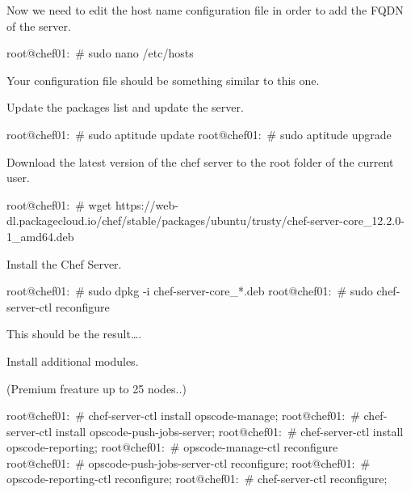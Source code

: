 Now we need to edit the host name configuration file in order to add the FQDN of the server.
\begin{codelisting}
\label{code:}
\codecaption{}
\begin{code}
root@chef01:~# sudo nano /etc/hosts
\end{code}
\end{codelisting}

Your configuration file should be something similar to this one.


Update the packages list and update the server.

\begin{codelisting}
\label{code:}
\codecaption{}
\begin{code}
root@chef01:~# sudo aptitude update
root@chef01:~# sudo aptitude upgrade
\end{code}
\end{codelisting}

Download the latest version of the chef server to the root folder of the current user.

\begin{codelisting}
\label{code:}
\codecaption{}
\begin{code}
root@chef01:~# wget https://web-dl.packagecloud.io/chef/stable/packages/ubuntu/trusty/chef-server-core_12.2.0-1_amd64.deb
\end{code}
\end{codelisting}

Install the Chef Server.

\begin{codelisting}
\label{code:}
\codecaption{}
\begin{code}
root@chef01:~# sudo dpkg -i chef-server-core_*.deb
root@chef01:~# sudo chef-server-ctl reconfigure
\end{code}
\end{codelisting}


This should be the result\ldots{}.

Install additional modules.


(Premium freature up to 25 nodes..)
\begin{codelisting}
\label{code:}
\codecaption{}
\begin{code}
root@chef01:~# chef-server-ctl install opscode-manage;
root@chef01:~# chef-server-ctl install opscode-push-jobs-server;
root@chef01:~# chef-server-ctl install opscode-reporting;
root@chef01:~# opscode-manage-ctl reconfigure
root@chef01:~# opscode-push-jobs-server-ctl reconfigure;
root@chef01:~# opscode-reporting-ctl reconfigure; 
root@chef01:~# chef-server-ctl reconfigure;

\end{code}
\end{codelisting}

